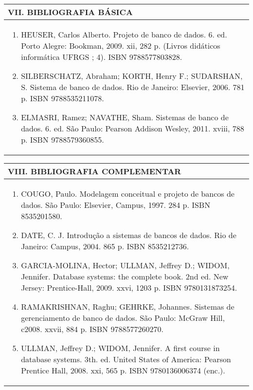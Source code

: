 \documentclass[12pt]{article}
\begin{document}
\begin{longtable}{|L{1.025\textwidth}|} \hline
%
{\bf VII. BIBLIOGRAFIA BÁSICA} \\ \hline
\begin{enumerate}
%
\item HEUSER, Carlos Alberto. Projeto de banco de dados. 6. ed. Porto Alegre: Bookman, 2009. xii, 282 p. (Livros didáticos informática UFRGS ; 4). ISBN 9788577803828.
\item SILBERSCHATZ, Abraham; KORTH, Henry F.; SUDARSHAN, S. Sistema de banco de dados. Rio de Janeiro: Elsevier, 2006. 781 p. ISBN 9788535211078.
\item ELMASRI, Ramez; NAVATHE, Sham. Sistemas de banco de dados. 6. ed. São Paulo: Pearson Addison Wesley, 2011. xviii, 788 p. ISBN 9788579360855.

\end{enumerate}
 \\ \hline
\end{longtable}



\begin{longtable}{|L{1.025\textwidth}|} \hline
%
{\bf VIII. BIBLIOGRAFIA COMPLEMENTAR} \\ \hline
\begin{enumerate}

\item COUGO, Paulo. Modelagem conceitual e projeto de bancos de dados. São Paulo: Elsevier, Campus, 1997. 284 p. ISBN 8535201580.

\item DATE, C. J. Introdução a sistemas de bancos de dados. Rio de Janeiro: Campus, 2004. 865 p. ISBN 8535212736.

\item GARCIA-MOLINA, Hector; ULLMAN, Jeffrey D.; WIDOM, Jennifer. Database systems: the complete book. 2nd ed. New Jersey: Prentice-Hall, 2009. xxvi, 1203 p. ISBN 9780131873254.

\item RAMAKRISHNAN, Raghu; GEHRKE, Johannes. Sistemas de gerenciamento de banco de dados. São Paulo: McGraw Hill, c2008. xxvii, 884 p. ISBN 9788577260270.

\item ULLMAN, Jeffrey D.; WIDOM, Jennifer. A first course in database systems. 3th. ed. United States of America: Pearson Prentice Hall, 2008. xxi, 565 p. ISBN 9780136006374 (enc.).

%
\end{enumerate}
 \\ \hline
\end{longtable}



\end{document}
